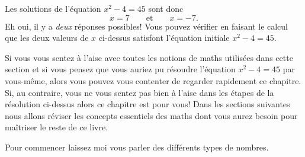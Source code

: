 	Les solutions de l'équation $x^2-4=45$ sont donc
	\[
	 	x  = 7 \qquad \textrm{et} \qquad   x=  - 7.
	\]
	Eh oui, il y a \emph{deux} réponses possibles!
	Vous pouvez vérifier en faisant le calcul que les deux valeurs de $x$ ci-dessus satisfont l'équation initiale $x^2-4=45$.

	\bigskip

	Si vous vous sentez à l'aise avec toutes les notions de maths utilisées dans cette section
	et si vous pensez que vous auriez pu résoudre l'équation $x^2-4=45$ par vous-même,
	alors vous pouvez vous contenter de regarder rapidement ce chapitre.
	Si, au contraire, vous ne vous sentez pas bien à l'aise dans les étapes de la résolution ci-dessus alors ce chapitre est pour vous!
	Dans les sections suivantes nous allons réviser les concepts essentiels des maths dont vous aurez besoin pour maîtriser le reste de ce livre.
	
	Pour commencer laissez moi vous parler des différents types de nombres.

